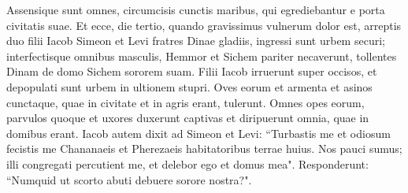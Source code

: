 \begin{biblechapter}
\verse Assensique sunt omnes, circumcisis cunctis maribus, qui egrediebantur e porta civitatis suae. 
\verse Et ecce, die tertio, quando gravissimus vulnerum dolor est, arreptis duo filii Iacob Simeon et Levi fratres Dinae gladiis, ingressi sunt urbem securi; interfectisque omnibus masculis, 
\verse Hemmor et Sichem pariter necaverunt, tollentes Dinam de domo Sichem sororem suam. 
\verse Filii Iacob irruerunt super occisos, et depopulati sunt urbem in ultionem stupri. 
\verse Oves eorum et armenta et asinos cunctaque, quae in civitate et in agris erant, tulerunt.  
\verse Omnes opes eorum, parvulos quoque et uxores duxerunt captivas et diripuerunt omnia, quae in domibus erant. 
\verse Iacob autem dixit ad Simeon et Levi: “Turbastis me et odiosum fecistis me Chananaeis et Pherezaeis habitatoribus terrae huius. Nos pauci sumus; illi congregati percutient me, et delebor ego et domus mea". 
\verse Responderunt: “Numquid ut scorto abuti debuere sorore nostra?". 
\end{biblechapter}


